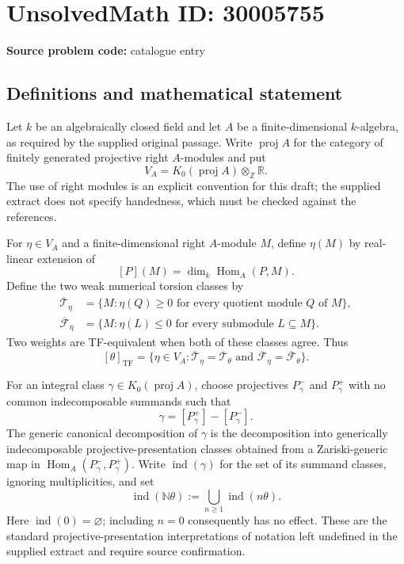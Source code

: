 \documentclass[11pt]{article}
\newcommand{\N}{\mathbb{N}}
\newcommand{\Z}{\mathbb{Z}}
\newcommand{\R}{\mathbb{R}}
\begin{document}
\section*{UnsolvedMath ID: 30005755}
\textbf{Source problem code:} catalogue entry
\subsection{Definitions and mathematical statement}
Let \(k\) be an algebraically closed field and let \(A\) be a finite-dimensional \(k\)-algebra, as required by the supplied original passage. Write \(\operatorname{proj}A\) for the category of finitely generated projective right \(A\)-modules and put
\[
V_A=K_0(\operatorname{proj}A)\otimes_{\Z}\R.
\]
The use of right modules is an explicit convention for this draft; the supplied extract does not specify handedness, which must be checked against the references.

For \(\eta\in V_A\) and a finite-dimensional right \(A\)-module \(M\), define \(\eta(M)\) by real-linear extension of
\[
[P](M)=\dim_k\operatorname{Hom}_A(P,M).
\]
Define the two weak numerical torsion classes by
\[
\begin{aligned}
\overline{\mathcal T}_{\eta}
 &=\{M:\eta(Q)\geq 0\text{ for every quotient module }Q\text{ of }M\},\\
\overline{\mathcal F}_{\eta}
 &=\{M:\eta(L)\leq 0\text{ for every submodule }L\subseteq M\}.
\end{aligned}
\]
Two weights are TF-equivalent when both of these classes agree. Thus
\[
[\theta]_{\mathrm{TF}}
 =\{\eta\in V_A:
 \overline{\mathcal T}_{\eta}=\overline{\mathcal T}_{\theta}
 \text{ and }
 \overline{\mathcal F}_{\eta}=\overline{\mathcal F}_{\theta}\}.
\]

For an integral class \(\gamma\in K_0(\operatorname{proj}A)\), choose projectives \(P_\gamma^-\) and \(P_\gamma^+\) with no common indecomposable summands such that
\[
\gamma=[P_\gamma^+]-[P_\gamma^-].
\]
The generic canonical decomposition of \(\gamma\) is the decomposition into generically indecomposable projective-presentation classes obtained from a Zariski-generic map in \(\operatorname{Hom}_A(P_\gamma^-,P_\gamma^+)\). Write \(\operatorname{ind}(\gamma)\) for the set of its summand classes, ignoring multiplicities, and set
\[
\operatorname{ind}(\N\theta)
 :=\bigcup_{n\geq 1}\operatorname{ind}(n\theta).
\]
Here \(\operatorname{ind}(0)=\varnothing\); including \(n=0\) consequently has no effect. These are the standard projective-presentation interpretations of notation left undefined in the supplied extract and require source confirmation.
\end{document}
